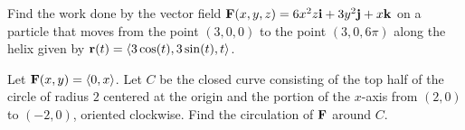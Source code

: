\begin{activity} \label{A:12.3.1}  
\ba
\item Find the work done by the vector field
  $\mathbf{F}(x,y,z) = 6x^2z\mathbf{i} + 3y^2\mathbf{j} + x\mathbf{k}$ on a particle that moves
  from the point $(3,0,0)$ to the point $(3,0,6\pi)$ along the helix
  given by $\mathbf{r}(t) = \langle 3\cos(t),3\sin(t),t\rangle$.
\item Let $\mathbf{F}(x,y) = \langle 0,x\rangle$. Let $C$ be the closed curve
  consisting of the top half of the circle of radius $2$ centered at
  the origin and the portion of the $x$-axis from $(2,0)$ to $(-2,0)$,
  oriented clockwise. Find the circulation of $\mathbf{F}$ around $C$.
\ea
\end{activity}
\begin{smallhint}

\end{smallhint}
\begin{bighint}

\end{bighint}
\begin{activitySolution}

\end{activitySolution}
\aftera
